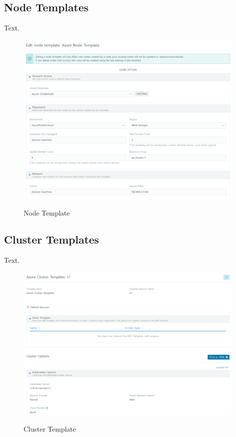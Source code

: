 \subsection{Node Templates}

Text. 

\begin{figure}[H]
\centering
\caption {Node Template}
\includegraphics[width=\linewidth]{images/node-template.png}
\label{fig:nodeTemplate}
\end{figure}

\subsection{Cluster Templates}

Text. 

\begin{figure}[H]
\centering
\caption {Cluster Template}
\includegraphics[width=\linewidth]{images/cluster-template.png}
\label{fig:clusterTemplate}
\end{figure}

